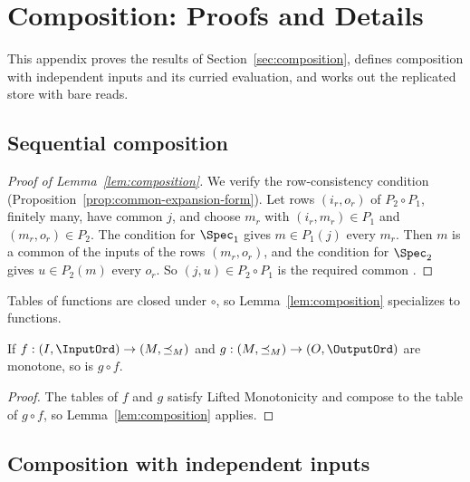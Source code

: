 \section{Composition: Proofs and Details}
\label{app:composition}

This appendix proves the results of Section~\ref{sec:composition}, defines
composition with independent inputs and its curried evaluation, and works out
the replicated store with bare reads.

\subsection{Sequential composition}

\begin{proof}[Proof of Lemma~\ref{lem:composition}]
We verify the row-consistency condition
(Proposition~\ref{prop:common-expansion-form}).  Let rows $(i_r,o_r)$ of
$P_2\circ P_1$, finitely many, have common \indesc $j$, and choose $m_r$ with
$(i_r,m_r)\in P_1$ and $(m_r,o_r)\in P_2$.  The condition for $\Spec_1$ gives
$m\in P_1(j)$ \outrelpart every $m_r$.  Then $m$ is a common \indesc of the
inputs of the rows $(m_r,o_r)$, and the condition for $\Spec_2$ gives
$u\in P_2(m)$ \outrelpart every $o_r$.  So $(j,u)\in P_2\circ P_1$ is the
required common \outnoun.
\end{proof}

Tables of functions are closed under $\circ$, so Lemma~\ref{lem:composition}
specializes to functions.

\begin{corollary}
\label{cor:functional-composition}
If $f:(I,\InputOrd)\to(M,\preceq_M)$ and
$g:(M,\preceq_M)\to(O,\OutputOrd)$ are monotone, so is $g\circ f$.
\end{corollary}

\begin{proof}
The tables of $f$ and $g$ satisfy Lifted Monotonicity and compose to the
table of $g\circ f$, so Lemma~\ref{lem:composition} applies.
\end{proof}

\subsection{Composition with independent inputs}
\label{sec:parameterized-composition}


